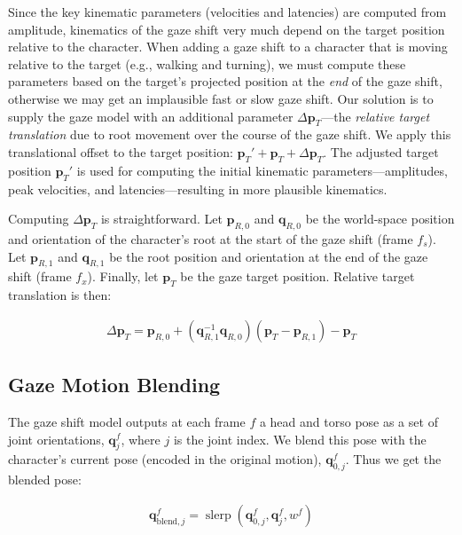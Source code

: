 Since the key kinematic parameters (velocities and latencies) are computed from amplitude, kinematics of the gaze shift very much depend on the target position relative to the character. When adding a gaze shift to a character that is moving relative to the target (e.g., walking and turning), we must compute these parameters based on the target's projected position at the \emph{end} of the gaze shift, otherwise we may get an implausible fast or slow gaze shift. Our solution is to supply the gaze model with an additional parameter $\Delta \mathbf{p}_T$---the \emph{relative target translation} due to root movement over the course of the gaze shift. We apply this translational offset to the target position: $\mathbf{p}_T' + \mathbf{p}_T + \Delta \mathbf{p}_T$. The adjusted target position $\mathbf{p}_T'$ is used for computing the initial kinematic parameters---amplitudes, peak velocities, and latencies---resulting in more plausible kinematics.

Computing $\Delta \mathbf{p}_T$ is straightforward. Let $\mathbf{p}_{R,0}$ and $\mathbf{q}_{R,0}$ be the world-space position and orientation of the character's root at the start of the gaze shift (frame $f_s$). Let $\mathbf{p}_{R,1}$ and $\mathbf{q}_{R,1}$ be the root position and orientation at the end of the gaze shift (frame $f_x$). Finally, let $\mathbf{p}_T$ be the gaze target position. Relative target translation is then:

\begin{align} \label{eq:GazeShiftTargetTrans}
\Delta \mathbf{p}_T = \mathbf{p}_{R,0} + (\mathbf{q}_{R,1}^{-1} \mathbf{q}_{R,0}) (\mathbf{p}_T - \mathbf{p}_{R,1}) - \mathbf{p}_T
\end{align}

\subsection{Gaze Motion Blending}
\label{sec:GazeMotionBlending}

The gaze shift model outputs at each frame $f$ a head and torso pose as a set of joint orientations, $\mathbf{q}_j^f$, where $j$ is the joint index. We blend this pose with the character's current pose (encoded in the original motion), $\mathbf{q}_{0,j}^f$. Thus we get the blended pose:

\begin{align} \label{eq:GazeShiftPoseBlend}
\mathbf{q}_{\mathrm{blend},j}^f = \mathop{slerp}(\mathbf{q}_{0,j}^f, \mathbf{q}_j^f, w^f)
\end{align}

